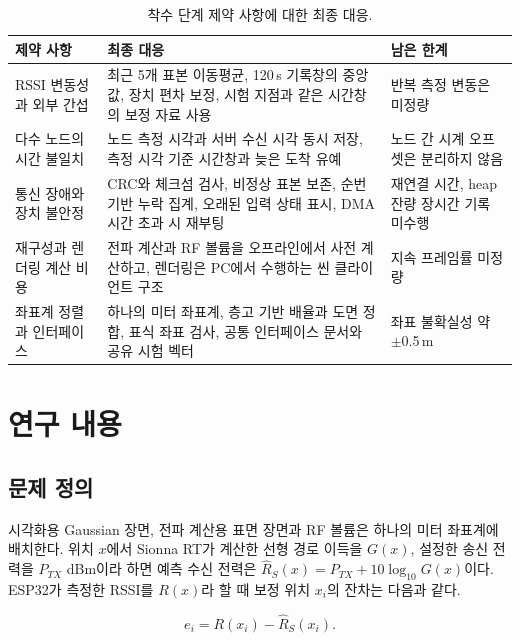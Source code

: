 \documentclass[11pt,a4paper]{article}
\begin{document}
\begin{table}[htbp]
  \centering\small
  \caption{착수 단계 제약 사항에 대한 최종 대응.}
  \label{tab:constraints}
  \renewcommand{\arraystretch}{1.2}
  \begin{tabularx}{\textwidth}{@{}>{\raggedright\arraybackslash}p{3.0cm}
    >{\raggedright\arraybackslash}X >{\raggedright\arraybackslash}p{4.2cm}@{}}
    \toprule
    제약 사항 & 최종 대응 & 남은 한계 \\
    \midrule
    RSSI 변동성과 외부 간섭 & 최근 5개 표본 이동평균, 120\,s 기록창의 중앙값, 장치 편차 보정, 시험 지점과 같은 시간창의 보정 자료 사용 & 반복 측정 변동은 미정량 \\
    다수 노드의 시간 불일치 & 노드 측정 시각과 서버 수신 시각 동시 저장, 측정 시각 기준 시간창과 늦은 도착 유예 & 노드 간 시계 오프셋은 분리하지 않음 \\
    통신 장애와 장치 불안정 & CRC와 체크섬 검사, 비정상 표본 보존, 순번 기반 누락 집계, 오래된 입력 상태 표시, DMA 시간 초과 시 재부팅 & 재연결 시간, heap 잔량 장시간 기록 미수행 \\
    재구성과 렌더링 계산 비용 & 전파 계산과 RF 볼륨을 오프라인에서 사전 계산하고, 렌더링은 PC에서 수행하는 씬 클라이언트 구조 & 지속 프레임률 미정량 \\
    좌표계 정렬과 인터페이스 & 하나의 미터 좌표계, 층고 기반 배율과 도면 정합, 표식 좌표 검사, 공통 인터페이스 문서와 공유 시험 벡터 & 좌표 불확실성 약 $\pm$0.5\,m \\
    \bottomrule
  \end{tabularx}
\end{table}

\section{연구 내용}
\label{sec:3}

\subsection{문제 정의}
\label{sec:3.1}

시각화용 Gaussian 장면, 전파 계산용 표면 장면과 RF 볼륨은 하나의 미터 좌표계에 배치한다. 위치 $x$에서 Sionna RT가 계산한 선형 경로 이득을 $G(x)$,
설정한 송신 전력을 $P_{TX}$ dBm이라 하면 예측 수신 전력은 $\hat{R}_S(x)=P_{TX}+10\log_{10}G(x)$이다. ESP32가 측정한 RSSI를
$R(x)$라 할 때 보정 위치 $x_i$의 잔차는 다음과 같다.

\begin{equation}
  \label{eq:1}
  e_i=R(x_i)-\hat{R}_S(x_i).
\end{equation}
\end{document}
